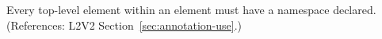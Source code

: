 Every top-level element within an  element must have a
namespace declared.  (References: L2V2 Section~\ref{sec:annotation-use}.)
